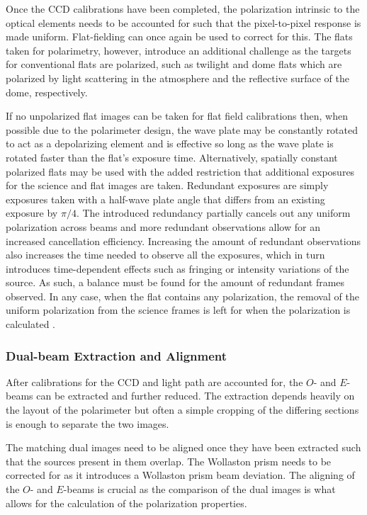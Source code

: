 Once the \gls{CCD} calibrations have been completed, the polarization intrinsic to the optical elements needs to be accounted for such that the pixel-to-pixel response is made uniform. Flat-fielding can once again be used to correct for this. The flats taken for polarimetry, however, introduce an additional challenge as the targets for conventional flats are polarized, such as twilight and dome flats which are polarized by light scattering in the atmosphere and the reflective surface of the dome, respectively.
\prgph

If no unpolarized flat images can be taken for flat field calibrations then, when possible due to the polarimeter design, the wave plate may be constantly rotated to act as a depolarizing element and is effective so long as the wave plate is rotated faster than the flat's exposure time. Alternatively, spatially constant polarized flats may be used with the added restriction that additional exposures for the science and flat images are taken. Redundant exposures are simply exposures taken with a half-wave plate angle that differs from an existing exposure by $\pi / 4$. The introduced redundancy partially cancels out any uniform polarization across beams and more redundant observations allow for an increased cancellation efficiency. Increasing the amount of  redundant observations also increases the time needed to observe all the exposures, which in turn introduces time-dependent effects such as fringing or intensity variations of the source. As such, a balance must be found for the amount of redundant frames observed. In any case, when the flat contains any polarization, the removal of the uniform polarization  from the science frames is left for when the polarization is calculated \citep{polarimetry_error, pol_optimize}.

\subsubsection{Dual-beam Extraction and Alignment}\label{subsubsec:pol_oe_extract}

After calibrations for the \gls{CCD} and light path are accounted for, the $O$- and $E$-beams can be extracted and further reduced. The extraction depends heavily on the layout of the polarimeter but often a simple cropping of the differing sections is enough to separate the two images.
\prgph

The matching dual images need to be aligned once they have been extracted such that the sources present in them overlap. The Wollaston prism needs to be corrected for as it introduces a Wollaston prism beam deviation. The aligning of the $O$- and $E$-beams is crucial as the comparison of the dual images is what allows for the calculation of the polarization properties.

